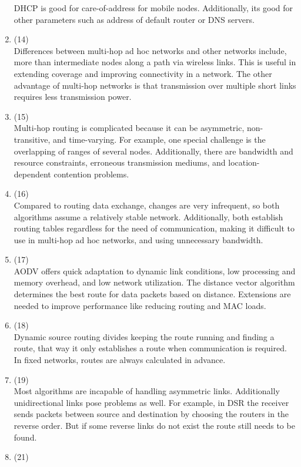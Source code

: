 \documentclass[11pt]{article}
\begin{document}
\begin{enumerate}[label=(\alph*)]
	 DHCP is good for care-of-address for mobile nodes. Additionally, 
	 its good for other parameters such as address of default router
	 or DNS servers. 	
\item (14) \\

	 Differences between multi-hop ad hoc networks and other networks
	 include, more than intermediate nodes along a path via wireless links. 
	 This is useful in extending coverage and improving connectivity in a
	 network. The other advantage of multi-hop networks is that transmission 
	 over multiple short links requires less transmission power. 
\item (15) \\

	 Multi-hop routing is complicated because it can be asymmetric, non-transitive, 
	 and time-varying. For example, one special challenge is the overlapping of ranges
	 of several nodes. Additionally, there are bandwidth and resource constraints, 
	 erroneous transmission mediums, and location-dependent contention problems.
\item (16) \\

	 Compared to routing data exchange, changes are very infrequent, so both algorithms
	 assume a relatively stable network. Additionally, both establish routing tables
	 regardless for the need of communication, making it difficult to use in multi-hop
	 ad hoc networks, and using unnecessary bandwidth.
\item (17) \\

	 AODV offers quick adaptation to dynamic link conditions, low processing and 
	 memory overhead, and low network utilization. The distance vector algorithm 
	 determines the best route for data packets based on distance. Extensions are needed
	 to improve performance like reducing routing and MAC loads.
\item (18) \\

	 Dynamic source routing divides keeping the route running and finding a route, that 
	 way it only establishes a route when communication is required. In fixed networks, 
	 routes are always calculated in advance. 
\item (19) \\

	 Most algorithms are incapable of handling asymmetric links. Additionally unidirectional
	 links pose problems as well. For example, in DSR the receiver sends packets 
	 between source and destination by choosing the routers in the reverse order.
	 But if some reverse links do not exist the route still needs to be found.
\item (21) \\


\end{enumerate}
\end{document}
